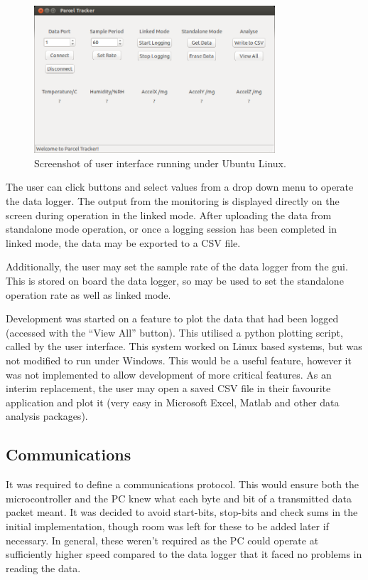 \documentclass[a4paper,10pt]{article}  %
\begin{document}
\begin{figure}[!htb]
  \begin{center}
    \includegraphics[width=0.8\textwidth]{GUI_Screenshot.png}
  \end{center}
  \caption{Screenshot of user interface running under Ubuntu Linux.}
  \label{fig:guiss}
\end{figure}

The user can click buttons and select values from a drop down menu to
operate the data logger. The output from the monitoring is displayed
directly on the screen during operation in the linked mode. After
uploading the data from standalone mode operation, or once a logging
session has been completed in linked mode, the data may be exported to
a CSV file.

Additionally, the user may set the sample rate of the data
logger from the gui. This is stored on board the data logger, so may
be used to set the standalone operation rate as well as linked
mode.

Development was started on a feature to plot the data that had been
logged (accessed with the ``View All'' button). This utilised a python
plotting script, called by the user interface. This system worked on
Linux based systems, but was not modified to run under Windows. This
would be a useful feature, however it was not implemented to allow
development of more critical features. As an interim replacement, the
user may open a saved CSV file in their favourite application and plot
it (very easy in Microsoft Excel, Matlab and other data analysis
packages).

\subsection{Communications}

It was required to define a communications protocol. This would ensure
both the microcontroller and the PC knew what each byte and bit of a
transmitted data packet meant. It was decided to avoid start-bits,
stop-bits and check sums in the initial implementation, though room
was left for these to be added later if necessary. In general, these
weren't required as the PC could operate at sufficiently higher speed
compared to the data logger that it faced no problems in reading the
data.
\end{document}
